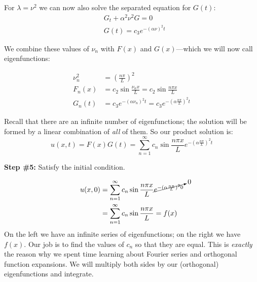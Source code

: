 \vspace{0.15cm}

\noindent For $\lambda = \nu^2$ we can now also solve the separated equation for $G(t)$:
\begin{align*}
&G_t + \alpha^2 \nu^2 G = 0 \\
&G(t) = c_3 e^{-(\alpha \nu)^2 t}
\end{align*}

\noindent We combine these values of $\nu_n$ with $F(x)$ and $G(x)$---which we will now call eigenfunctions: 

\begin{align*}
\nu^2_n &= \left(\frac{n \pi}{L} \right)^2 \\
F_n(x) &= c_2\sin{\frac{\nu_n x}{L}} = c_2\sin{\frac{n \pi x}{L}} \\
G_n(t) &= c_3e^{-(\alpha \nu_n)^2 t} = c_3 e^{-(\alpha \frac{n \pi}{L})^2 t}
\end{align*}

\noindent Recall that there are an infinite number of eigenfunctions; the solution will be formed by a linear combination of \emph{all} of them.  So our product solution is:
\begin{equation*}
u(x,t) = F(x)G(t) = \sum\limits_{n=1}^{\infty} c_n \sin{\frac{n \pi x}{L}} e^{-(\alpha \frac{n \pi}{L})^2 t}
\end{equation*}

\vspace{0.5cm}

\noindent\textbf{Step \#5:} Satisfy the initial condition.

\begin{align*}
u(x,0) &= \sum\limits_{n=1}^{\infty}c_n \sin{\frac{n \pi x}{L}} \cancelto{0}{e^{-(\alpha \frac{n \pi}{L})^2 0}} \\
&= \sum\limits_{n=1}^{\infty}c_n \sin{\frac{n \pi x}{L}} = f(x)
\end{align*}
On the left we have an infinite series of eigenfunctions; on the right we have $f(x)$.  Our job is to find the values of $c_n$ so that they are equal.  This is \emph{exactly} the reason why we spent time learning about Fourier series and orthogonal function expansions.  We will multiply both sides by our (orthogonal) eigenfunctions and integrate.

